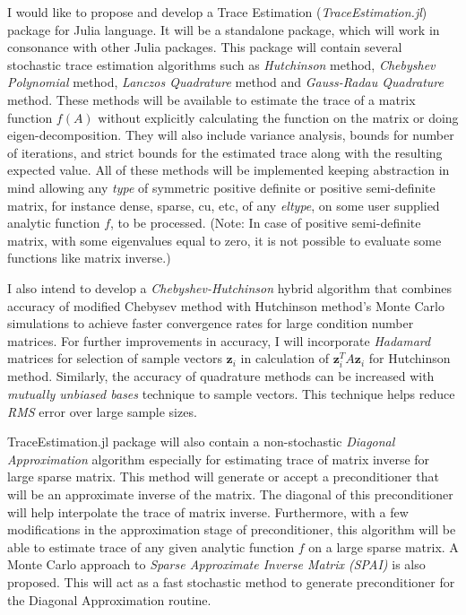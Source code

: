 \documentclass[12]{article}
\begin{document}
I would like to propose and develop a Trace Estimation (\textit{TraceEstimation.jl}) package for Julia language. It will be a standalone package, which will work in consonance with other Julia packages. This package will contain several stochastic trace estimation algorithms such as \textit{Hutchinson} method\cite{hutchinson1989stochastic}, \textit{Chebyshev Polynomial} method\cite{han2015large}, \textit{Lanczos Quadrature} method\cite{ubaru2017fast} and \textit{Gauss-Radau Quadrature} method\cite{bai1996some}. These methods will be available to estimate the trace of a matrix function $f(A)$ without explicitly calculating the function on the matrix or doing eigen-decomposition. They will also include variance analysis, bounds for number of iterations, and strict bounds\cite{roosta2015improved} for the estimated trace along with the resulting expected value. All of these methods will be implemented keeping abstraction in mind allowing any \textit{type} of symmetric positive definite or positive semi-definite matrix, for instance dense, sparse, cu, etc, of any \textit{eltype}, on some user supplied analytic function $f$, to be processed. (Note: In case of positive semi-definite matrix, with some eigenvalues equal to zero, it is not possible to evaluate some functions like matrix inverse.)

I also intend to develop a \textit{Chebyshev-Hutchinson} hybrid algorithm that combines accuracy of modified Chebysev method\cite{meurant2009estimates} with Hutchinson method's Monte Carlo simulations to achieve faster convergence rates for large condition number matrices. For further improvements in accuracy, I will incorporate \textit{Hadamard} matrices\cite{fika2017stochastic} for selection of sample vectors $\textbf{z}_i$ in calculation of $\textbf{z}^T_iA\textbf{z}_i$ for Hutchinson method. Similarly, the accuracy of quadrature methods can be increased with \textit{mutually unbiased bases} technique\cite{fitzsimons2016improved} to sample vectors. This technique helps reduce \textit{RMS} error over large sample sizes.       

TraceEstimation.jl package will also contain a non-stochastic \textit{Diagonal Approximation} algorithm\cite{wu2016estimating} especially for estimating trace of matrix inverse for large sparse matrix. This method will generate or accept a preconditioner that will be an approximate inverse of the matrix. The diagonal of this preconditioner will help interpolate the trace of matrix inverse. Furthermore, with a few modifications in the approximation stage of preconditioner, this algorithm will be able to estimate trace of any given analytic function $f$ on a large sparse matrix. A Monte Carlo approach to \textit{Sparse Approximate Inverse Matrix (SPAI)}\cite{strassburg2013monte} is also proposed. This will act as a fast stochastic method to generate preconditioner for the Diagonal Approximation routine.
\end{document}
